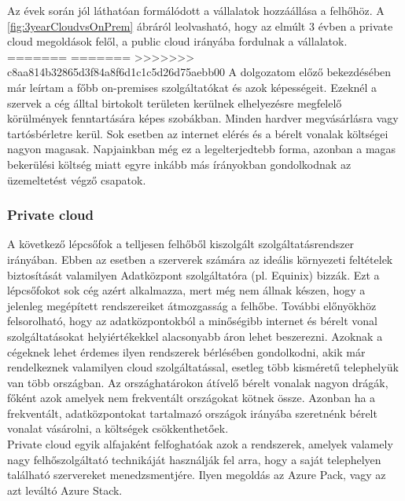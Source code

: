 \documentclass[12pt,oneside,justify,table]{book}
\begin{document}
Az évek során jól láthatóan formálódott a vállalatok hozzáállása a felhőhöz. A \ref{fig:3yearCloudvsOnPrem} ábráról leolvasható, hogy az elmúlt 3 évben a private cloud megoldások felől, a public cloud irányába fordulnak a vállalatok.
=======
=======
>>>>>>> c8aa814b32865d3f84a8f6d1c1c5d26d75aebb00
A dolgozatom előző bekezdésében már leírtam a főbb on-premises szolgáltatókat és azok képességeit. Ezeknél a szervek a cég álltal birtokolt területen kerülnek elhelyezésre megfelelő körülmények fenntartására képes szobákban. Minden hardver megvásárlásra vagy tartósbérletre kerül. Sok esetben az internet elérés és a bérelt vonalak költségei nagyon magasak.  Napjainkban még ez a legelterjedtebb forma, azonban a magas bekerülési költség miatt egyre inkább más írányokban gondolkodnak az üzemeltetést végző csapatok.\\

\subsubsection{Private cloud}
A következő lépcsőfok a telljesen felhőből kiszolgált szolgáltatásrendszer irányában. Ebben az esetben a szerverek számára az ideális környezeti feltételek biztosítását valamilyen Adatközpont szolgáltatóra (pl. Equinix) bizzák. Ezt a lépcsőfokot sok cég azért alkalmazza, mert még nem állnak készen, hogy a jelenleg megépített rendszereiket átmozgasság a felhőbe. További előnyökhöz felsorolható, hogy az adatközpontokból a minőségibb internet és bérelt vonal szolgáltatásokat helyiértékekkel alacsonyabb áron lehet beszerezni. Azoknak a cégeknek lehet érdemes ilyen rendszerek bérlésében gondolkodni, akik már rendelkeznek valamilyen cloud szolgáltatással, esetleg több kisméretű telephelyük van több országban. Az országhatárokon átívelő bérelt vonalak nagyon drágák, főként azok amelyek nem frekventált országokat kötnek össze. Azonban ha a frekventált, adatközpontokat tartalmazó országok irányába szeretnénk bérelt vonalat vásárolni, a költségek csökkenthetőek. \\
Private cloud egyik alfajaként felfoghatóak azok a rendszerek, amelyek valamely nagy felhőszolgáltató technikáját használják fel arra, hogy a saját telephelyen található szervereket menedzsmentjére. Ilyen megoldás az Azure Pack, vagy az azt leváltó Azure Stack. \\
\end{document}
